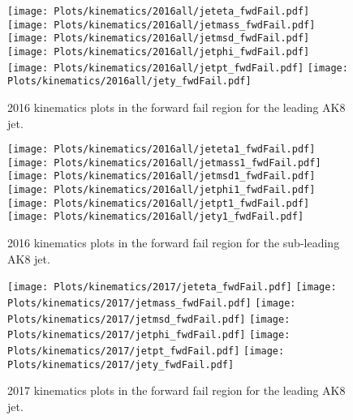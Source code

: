 \begin{figure}[htp]
	\begin{center}
		
		\texttt{[image: Plots/kinematics/2016all/jeteta\_fwdFail.pdf]}
		\texttt{[image: Plots/kinematics/2016all/jetmass\_fwdFail.pdf]}
		\texttt{[image: Plots/kinematics/2016all/jetmsd\_fwdFail.pdf]}
		\texttt{[image: Plots/kinematics/2016all/jetphi\_fwdFail.pdf]}
		\texttt{[image: Plots/kinematics/2016all/jetpt\_fwdFail.pdf]}
		\texttt{[image: Plots/kinematics/2016all/jety\_fwdFail.pdf]}
		
		\caption{2016 kinematics plots in the forward fail region for the leading AK8 jet.}
		\label{fig:kin2016_fwdFail}
	\end{center}
\end{figure}



\begin{figure}[htp]
	\begin{center}

		\texttt{[image: Plots/kinematics/2016all/jeteta1\_fwdFail.pdf]}
		\texttt{[image: Plots/kinematics/2016all/jetmass1\_fwdFail.pdf]}
		\texttt{[image: Plots/kinematics/2016all/jetmsd1\_fwdFail.pdf]}
		\texttt{[image: Plots/kinematics/2016all/jetphi1\_fwdFail.pdf]}
		\texttt{[image: Plots/kinematics/2016all/jetpt1\_fwdFail.pdf]}
		\texttt{[image: Plots/kinematics/2016all/jety1\_fwdFail.pdf]}

		\caption{2016 kinematics plots in the forward fail region for the sub-leading AK8 jet.}
		\label{fig:kin2016_fwdFail}
	\end{center}
\end{figure}



\begin{figure}[htp]
	\begin{center}
		
		\texttt{[image: Plots/kinematics/2017/jeteta\_fwdFail.pdf]}
		\texttt{[image: Plots/kinematics/2017/jetmass\_fwdFail.pdf]}
		\texttt{[image: Plots/kinematics/2017/jetmsd\_fwdFail.pdf]}
		\texttt{[image: Plots/kinematics/2017/jetphi\_fwdFail.pdf]}
		\texttt{[image: Plots/kinematics/2017/jetpt\_fwdFail.pdf]}
		\texttt{[image: Plots/kinematics/2017/jety\_fwdFail.pdf]}
		
		\caption{2017 kinematics plots in the forward fail region for the leading AK8 jet.}
		\label{fig:kin2017_fwdFail}
	\end{center}
\end{figure}



